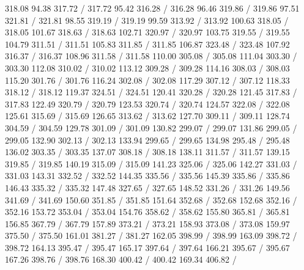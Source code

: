 { 318.08 94.38 317.72 /
 317.72 95.42 316.28 /
 316.28 96.46 319.86 /
 319.86 97.51 321.81 /
 321.81 98.55 319.19 /
 319.19 99.59 313.92 /
 313.92 100.63 318.05 /
 318.05 101.67 318.63 /
 318.63 102.71 320.97 /
 320.97 103.75 319.55 /
 319.55 104.79 311.51 /
 311.51 105.83 311.85 /
 311.85 106.87 323.48 /
 323.48 107.92 316.37 /
 316.37 108.96 311.58 /
 311.58 110.00 305.08 /
 305.08 111.04 303.30 /
 303.30 112.08 310.02 /
 310.02 113.12 309.28 /
 309.28 114.16 308.03 /
 308.03 115.20 301.76 /
 301.76 116.24 302.08 /
 302.08 117.29 307.12 /
 307.12 118.33 318.12 /
 318.12 119.37 324.51 /
 324.51 120.41 320.28 /
 320.28 121.45 317.83 /
 317.83 122.49 320.79 /
 320.79 123.53 320.74 /
 320.74 124.57 322.08 /
 322.08 125.61 315.69 /
 315.69 126.65 313.62 /
 313.62 127.70 309.11 /
 309.11 128.74 304.59 /
 304.59 129.78 301.09 /
 301.09 130.82 299.07 /
 299.07 131.86 299.05 /
 299.05 132.90 302.13 /
 302.13 133.94 299.65 /
 299.65 134.98 295.48 /
 295.48 136.02 303.35 /
 303.35 137.07 308.18 /
 308.18 138.11 311.57 /
 311.57 139.15 319.85 /
 319.85 140.19 315.09 /
 315.09 141.23 325.06 /
 325.06 142.27 331.03 /
 331.03 143.31 332.52 /
 332.52 144.35 335.56 /
 335.56 145.39 335.86 /
 335.86 146.43 335.32 /
 335.32 147.48 327.65 /
 327.65 148.52 331.26 /
 331.26 149.56 341.69 /
 341.69 150.60 351.85 /
 351.85 151.64 352.68 /
 352.68 152.68 352.16 /
 352.16 153.72 353.04 /
 353.04 154.76 358.62 /
 358.62 155.80 365.81 /
 365.81 156.85 367.79 /
 367.79 157.89 373.21 /
 373.21 158.93 373.08 /
 373.08 159.97 375.50 /
 375.50 161.01 381.27 /
 381.27 162.05 398.99 /
 398.99 163.09 398.72 /
 398.72 164.13 395.47 /
 395.47 165.17 397.64 /
 397.64 166.21 395.67 /
 395.67 167.26 398.76 /
 398.76 168.30 400.42 /
 400.42 169.34 406.82 /
}
